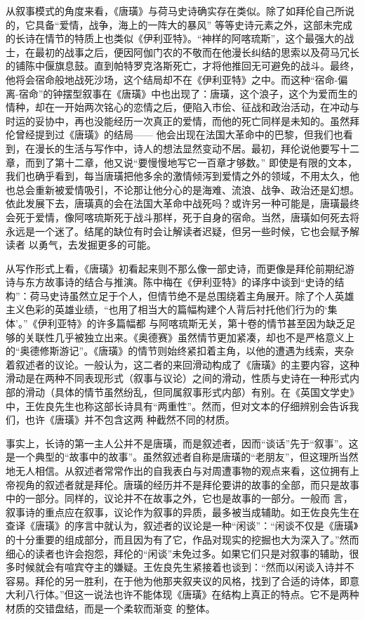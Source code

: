 \documentclass{article}
\begin{document}
从叙事模式的角度来看，《唐璜》与荷马史诗确实存在类似。除了如拜伦自己所说的，它具备“爱情，战争，海上的一阵大的暴风” 等等史诗元素之外，这部未完成的长诗在情节的特质上也类似《伊利亚特》。“神样的阿喀琉斯”，这个最强大的战士，在最初的战事之后，便因阿伽门农的不敬而在他漫长纠结的思索以及荷马冗长的铺陈中偃旗息鼓。直到帕特罗克洛斯死亡，才将他推回无可避免的战斗。最终，他将会宿命般地战死沙场，这个结局却不在《伊利亚特》之中。而这种“宿命-偏离-宿命”的钟摆型叙事在《唐璜》中也出现了：唐璜，这个浪子，这个为爱而生的情种，却在一开始两次铭心的恋情之后，便陷入市侩、征战和政治活动，在冲动与时运的妥协中，再也没能经历一次真正的爱情，而他的死亡同样是未知的。虽然拜伦曾经提到过《唐璜》的结局——
\newpage
他会出现在法国大革命中的巴黎，但我们也看到，在漫长的生活与写作中，诗人的想法显然变动不居。最初，拜伦说他要写十二章，而到了第十二章，他又说“要慢慢地写它一百章才够数。” 即使是有限的文本，我们也确乎看到，每当唐璜把他多余的激情倾泻到爱情之外的领域，不用太久，他也总会重新被爱情吸引，不论那让他分心的是海难、流浪、战争、政治还是幻想。依此发展下去，唐璜真的会在法国大革命中战死吗？或许另一种可能是，唐璜最终会死于爱情，像阿喀琉斯死于战斗那样，死于自身的宿命。当然，唐璜如何死去将永远是一个迷了。结尾的缺位有时会让解读者迟疑，但另一些时候，它也会赋予解读者
以勇气，去发掘更多的可能。 

从写作形式上看，《唐璜》初看起来则不那么像一部史诗，而更像是拜伦前期纪游诗与东方故事诗的结合与推演。陈中梅在《伊利亚特》的译序中谈到“史诗的结构”：荷马史诗虽然立足于个人，但情节绝不是总围绕着主角展开。除了个人英雄主义色彩的英雄业绩，“也用了相当大的篇幅构建个人背后衬托他们行为的‘集体’。”《伊利亚特》的许多篇幅都
\newpage
与阿喀琉斯无关，第十卷的情节甚至因为缺乏足够的关联性几乎被独立出来。《奥德赛》虽然情节更加紧凑，却也不是严格意义上的“奥德修斯游记”。《唐璜》的情节则始终紧扣着主角，以他的遭遇为线索，夹杂着叙述者的议论。一般认为，这二者的来回滑动构成了《唐璜》的主要内容，这种滑动是在两种不同表现形式（叙事与议论）之间的滑动，性质与史诗在一种形式内部的滑动（具体的情节虽然纷乱，但同属叙事形式内部）有别。在《英国文学史》中，王佐良先生也称这部长诗具有“两重性”。然而，但对文本的仔细辨别会告诉我们，也许《唐璜》并不包含这两
种截然不同的材质。 

事实上，长诗的第一主人公并不是唐璜，而是叙述者，因而“谈话”先于“叙事”。这是一个典型的“故事中的故事”。虽然叙述者自称是唐璜的“老朋友”，但这理所当然地无人相信。从叙述者常常作出的自我表白与对周遭事物的观点来看，这位拥有上帝视角的叙述者就是拜伦。唐璜的经历并不是拜伦要讲的故事的全部，而只是故事中的一部分。同样的，议论并不在故事之外，它也是故事的一部分。一般而
\newpage
言，叙事诗的重点应在叙事，议论作为叙事的异质，最多被当成辅助。如王佐良先生在查译《唐璜》的序言中就认为，叙述者的议论是一种“闲谈”：“闲谈不仅是《唐璜》的十分重要的组成部分，而且因为有了它，作品对现实的挖掘也大为深入了。”然而细心的读者也许会抱怨，拜伦的“闲谈”未免过多。如果它们只是对叙事的辅助，很多时候就会有喧宾夺主的嫌疑。王佐良先生紧接着也谈到：“然而以闲谈入诗并不容易。拜伦的另一胜利，在于他为他那夹叙夹议的风格，找到了合适的诗体，即意大利八行体。”但这一说法也许不能体现《唐璜》在结构上真正的特点。它不是两种材质的交错盘结，而是一个柔软而渐变
的整体。 
\end{document}
